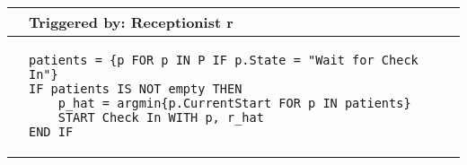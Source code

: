 \begin{tabular}{@{}>{\raggedright\arraybackslash}p{0.25cm}>{\raggedright\arraybackslash}p{13cm}@{}}
  \toprule
   & Triggered by: Receptionist r\\ \midrule 
  &
\begin{lstlisting}[language=CMPseudo]
patients = {p FOR p IN P IF p.State = "Wait for Check In"}
IF patients IS NOT empty THEN 
    p_hat = argmin{p.CurrentStart FOR p IN patients}
    START Check In WITH p, r_hat
END IF
  \end{lstlisting}  
  \\ \bottomrule
  \end{tabular}
